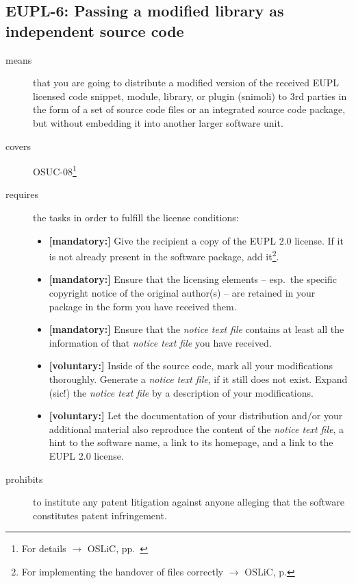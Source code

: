 \subsection{EUPL-6: Passing a modified library as independent source code}
\label{OSUC-08-EUPL}

\begin{description}
\item[means] that you are going to distribute a modified version of the received
EUPL licensed code snippet, module, library, or plugin (snimoli) to 3rd
parties in the form of a set of source code files or an integrated source code
package, but without embedding it into another larger software unit.
\item[covers] OSUC-08\footnote{For details $\rightarrow$ OSLiC, pp.\ \pageref{OSUC-08-DEF}}
\item[requires] the tasks in order to fulfill the license conditions:
\begin{itemize}
  
  \item \textbf{[mandatory:]} Give the recipient a copy of the EUPL 2.0
  license. If it is not already present in the software package, add
  it\footnote{For implementing the handover of files correctly $\rightarrow$
  OSLiC, p. \pageref{DistributingFilesHint}}.

  \item \textbf{[mandatory:]} Ensure that the licensing elements -- esp.\ the
  specific copyright notice of the original author(s) -- are retained in your
  package in the form you have received them.
  
  \item \textbf{[mandatory:]} Ensure that the \emph{notice text file} contains at least
  all the information of that \emph{notice text file} you have received.
 
  \item \textbf{[voluntary:]} Inside of the source code, mark all your
  modifications thoroughly. Generate a \emph{notice text file}, if it still does not
  exist. Expand (sic!) the \emph{notice text file} by a description of your
  modifications.
   
  \item \textbf{[voluntary:]} Let the documentation of your distribution and/or
  your additional material also reproduce the content of the \emph{notice text
  file}, a hint to the software name, a link to its homepage, and a link to the
  EUPL 2.0 license.

\end{itemize}

\item[prohibits] to institute any patent litigation against anyone alleging that
the software constitutes patent infringement.

\end{description}


